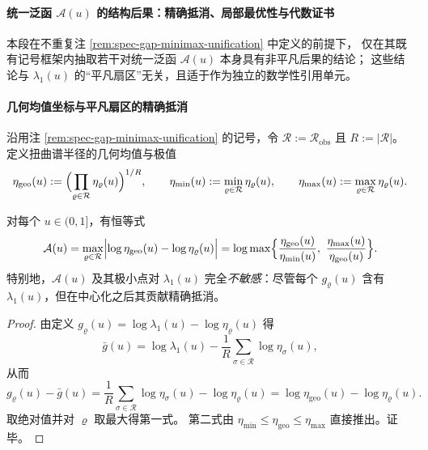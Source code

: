 \paragraph{统一泛函 \texorpdfstring{$\mathcal{A}(u)$}{A(u)} 的结构后果：精确抵消、局部最优性与代数证书}\label{par:gut-unification-functional-structures}
本段在不重复注 \ref{rem:spec-gap-minimax-unification} 中定义的前提下，
仅在其既有记号框架内抽取若干对统一泛函 \(\mathcal{A}(u)\) 本身具有非平凡后果的结论；
这些结论与 \(\lambda_1(u)\) 的“平凡扇区”无关，且适于作为独立的数学性引用单元。

\paragraph{几何均值坐标与平凡扇区的精确抵消}
沿用注 \ref{rem:spec-gap-minimax-unification} 的记号，令
\(
\mathcal{R}:=\mathcal{R}_{\mathrm{obs}}
\)
且
\(
R:=|\mathcal{R}|
\)。
定义扭曲谱半径的几何均值与极值
\[
\eta_{\mathrm{geo}}(u):=\Bigl(\prod_{\varrho\in\mathcal{R}}\eta_\varrho(u)\Bigr)^{1/R},
\qquad
\eta_{\min}(u):=\min_{\varrho\in\mathcal{R}}\eta_\varrho(u),
\qquad
\eta_{\max}(u):=\max_{\varrho\in\mathcal{R}}\eta_\varrho(u).
\]

\begin{proposition}[精确抵消与内禀形式]\label{prop:gut-A-cancels-lambda1}
对每个 \(u\in(0,1]\)，有恒等式
\[
\mathcal{A}(u)
=\max_{\varrho\in\mathcal{R}}\Bigl|\log\eta_{\mathrm{geo}}(u)-\log\eta_\varrho(u)\Bigr|
=\log\max\Bigl\{\frac{\eta_{\mathrm{geo}}(u)}{\eta_{\min}(u)},\ \frac{\eta_{\max}(u)}{\eta_{\mathrm{geo}}(u)}\Bigr\}.
\]
特别地，\(\mathcal{A}(u)\) 及其极小点对 \(\lambda_1(u)\) 完全\emph{不敏感}：尽管每个 \(g_\varrho(u)\) 含有 \(\lambda_1(u)\)，但在中心化之后其贡献精确抵消。
\end{proposition}

\begin{proof}
由定义 \(g_\varrho(u)=\log\lambda_1(u)-\log\eta_\varrho(u)\) 得
\[
\bar g(u)=\log\lambda_1(u)-\frac{1}{R}\sum_{\sigma\in\mathcal{R}}\log\eta_\sigma(u),
\]
从而
\[
g_\varrho(u)-\bar g(u)
=\frac{1}{R}\sum_{\sigma\in\mathcal{R}}\log\eta_\sigma(u)-\log\eta_\varrho(u)
=\log\eta_{\mathrm{geo}}(u)-\log\eta_\varrho(u).
\]
取绝对值并对 \(\varrho\) 取最大得第一式。
第二式由 \(\eta_{\min}\le \eta_{\mathrm{geo}}\le \eta_{\max}\) 直接推出。证毕。
\end{proof}

